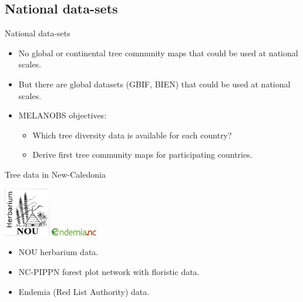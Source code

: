 \documentclass[10pt,table,dvipsnames,compress]{beamer}
\begin{document}
\subsection{National data-sets}
\label{sec:org3ce1ad2}

\begin{frame}[label={sec:orge10f99a}]{National data-sets}
\begin{itemize}
\item No global or continental tree community maps that could be used at national scales.
\item But there are global datasets (GBIF, BIEN) that could be used at national scales.
\item MELANOBS objectives:
\begin{itemize}
\item Which tree diversity data is available for each country?
\item Derive first tree community maps for participating countries.
\end{itemize}
\end{itemize}
\end{frame}

\begin{frame}[label={sec:orgae55c6b}]{Tree data in New-Caledonia}
\begin{center}
\includegraphics[width=2cm]{figs/biodiv/NOU-herbarium-logo.jpg}
\includegraphics[width=2cm]{figs/biodiv/logo_endemia.png}
\end{center}

\begin{itemize}
\item NOU herbarium data.
\item NC-PIPPN forest plot network with floristic data.
\item Endemia (Red List Authority) data.
\end{itemize}
\end{frame}
\end{document}
